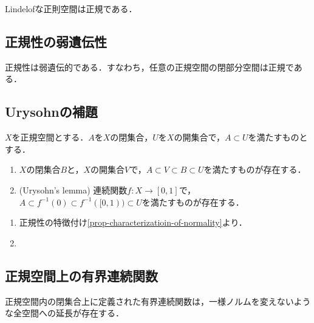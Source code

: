 \documentclass[uplatex,dvipdfmx]{jsreport}
\begin{document}
\begin{proposition}
    Lindelofな正則空間は正規である．
\end{proposition}

\subsection{正規性の弱遺伝性}

\begin{proposition}
    正規性は弱遺伝的である．すなわち，任意の正規空間の閉部分空間は正規である．
\end{proposition}

\subsection{Urysohnの補題}

\begin{lemma}\label{lemma-Urysohn's-lemma}
    $X$を正規空間とする．$A$を$X$の閉集合，$U$を$X$の開集合で，$A\subset U$を満たすものとする．
    \begin{enumerate}
        \item $X$の閉集合$B$と，$X$の開集合$V$で，$A\subset V\subset B\subset U$を満たすものが存在する．
        \item (Urysohn's lemma) 連続関数$f:X\to[0,1]$で，$A\subset f^{-1}(0)\subset f^{-1}([0,1))\subset U$を満たすものが存在する．
    \end{enumerate}
\end{lemma}
\begin{Proof}\mbox{}
    \begin{enumerate}
        \item 正規性の特徴付け\ref{prop-characterizatioin-of-normality}より．
        \item 
    \end{enumerate}
\end{Proof}

\subsection{正規空間上の有界連続関数}

\begin{tcolorbox}[colframe=ForestGreen, colback=ForestGreen!10!white,breakable,colbacktitle=ForestGreen!40!white,coltitle=black,fonttitle=\bfseries\sffamily,
title=]
    正規空間内の閉集合上に定義された有界連続関数は，一様ノルムを変えないような全空間への延長が存在する．
\end{tcolorbox}
\end{document}
